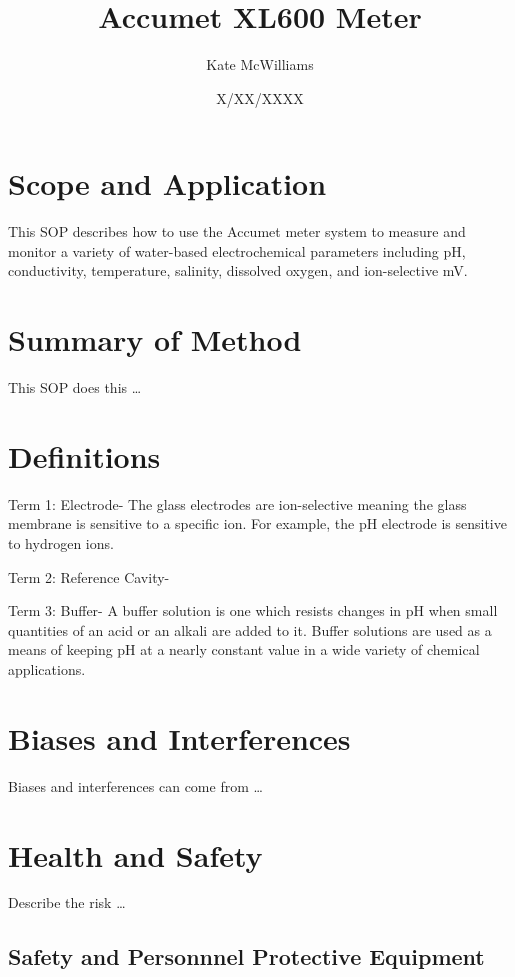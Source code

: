 \documentclass[12pt]{../SOP3_beta}\usepackage[]{graphicx}\usepackage[]{color}
\title{Accumet XL600 Meter}
\date{X/XX/XXXX}
\author{Kate McWilliams}
\begin{document}
\maketitle

\section{Scope and Application}

\NP This SOP describes how to use the Accumet meter system to measure and monitor a variety of water-based electrochemical parameters including pH, conductivity, temperature, salinity, dissolved oxygen, and ion-selective mV.

\section{Summary of Method}

\NP This SOP does this \dots

\tableofcontents

\newpage

\section{Definitions}

\NP Term 1: Electrode- The glass electrodes are ion-selective meaning the glass membrane is sensitive to a specific ion. For example, the pH electrode is sensitive to hydrogen ions. 

\NP Term 2: Reference Cavity-

\NP Term 3: Buffer- A buffer solution is one which resists changes in pH when small quantities of an acid or an alkali are added to it. Buffer solutions are used as a means of keeping pH at a nearly constant value in a wide variety of chemical applications. 

\section{Biases and Interferences}

\NP Biases and interferences can come from \dots

\section{Health and Safety}

\NP Describe the risk \dots


\subsection{Safety and Personnnel Protective Equipment}
\end{document}
